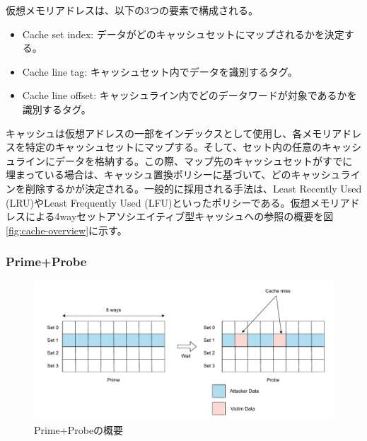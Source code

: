 仮想メモリアドレスは、以下の3つの要素で構成される。

\begin{itemize}
  \item Cache set index: データがどのキャッシュセットにマップされるかを決定する。
  \item Cache line tag: キャッシュセット内でデータを識別するタグ。
  \item Cache line offset: キャッシュライン内でどのデータワードが対象であるかを識別するタグ。
\end{itemize}

キャッシュは仮想アドレスの一部をインデックスとして使用し、各メモリアドレスを特定のキャッシュセットにマップする。そして、セット内の任意のキャッシュラインにデータを格納する。この際、マップ先のキャッシュセットがすでに埋まっている場合は、キャッシュ置換ポリシーに基づいて、どのキャッシュラインを削除するかが決定される。一般的に採用される手法は、Least Recently Used (LRU)やLeast Frequently Used (LFU)といったポリシーである。仮想メモリアドレスによる4wayセットアソシエイティブ型キャッシュへの参照の概要を図\ref{fig:cache-overview}に示す。

\subsubsection{Prime+Probe}

\begin{figure}[tb]
  \centering
  \includegraphics[width=\linewidth]{img/prime+probe.drawio.pdf}
  \caption{Prime+Probeの概要}\label{fig:prime-probe}
\end{figure}

